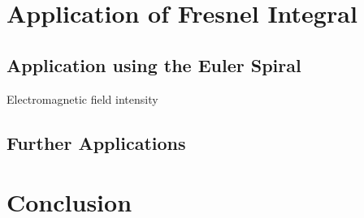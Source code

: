 \documentclass[12pt]{article}
\begin{document}
\section{Application of Fresnel Integral}
\subsection{Application using the Euler Spiral}
\cite{BH12}
Electromagnetic field intensity

\subsection{Further Applications}


\section{Conclusion}



\nocite{AS, BE, Sim, Str, WW}  %
\end{document}
